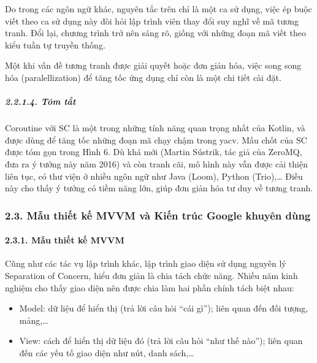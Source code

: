 Do trong các ngôn ngữ khác, nguyên tắc trên chỉ là một ca sử dụng, việc
ép buộc viết theo ca sử dụng này đòi hỏi lập trình viên thay đổi suy
nghĩ về mã tương tranh. Đổi lại, chương trình trở nên sáng rõ, giống với
những đoạn mã viết theo kiểu tuần tự truyền thống.

Một khi vấn đề tương tranh được giải quyết hoặc đơn giản hóa, việc song
song hóa (paralellization) để tăng tốc ứng dụng chỉ còn là một chi tiết
cài đặt.

\hypertarget{tuxf3m-tux1eaft}{%
  \subparagraph{2.2.1.4. Tóm tắt}\label{tuxf3m-tux1eaft}}

Coroutine với SC là một trong những tính năng quan trọng nhất của
Kotlin, và được dùng để tăng tốc những đoạn mã chạy chậm trong yacv. Mấu
chốt của SC được tóm gọn trong Hình 6. Dù khá mới (Martin Sústrik, tác
giả của ZeroMQ, đưa ra ý tưởng này năm 2016) và còn tranh cãi, mô hình
này vẫn được cải thiện liên tục, có thư viện ở nhiều ngôn ngữ như Java
(Loom), Python (Trio),\ldots{} Điều này cho thấy ý tưởng có tiềm năng
lớn, giúp đơn giản hóa tư duy về tương tranh.

\hypertarget{mux1eabu-thiux1ebft-kux1ebf-mvvm-vuxe0-kiux1ebfn-truxfac-google-khuyuxean-duxf9ng}{%
  \subsubsection{\texorpdfstring{2.3. Mẫu thiết kế MVVM và Kiến trúc
      Google khuyên dùng
    }{2.3. Mẫu thiết kế MVVM và Kiến trúc Google khuyên dùng }}\label{mux1eabu-thiux1ebft-kux1ebf-mvvm-vuxe0-kiux1ebfn-truxfac-google-khuyuxean-duxf9ng}}

\hypertarget{mux1eabu-thiux1ebft-kux1ebf-mvvm}{%
  \paragraph{\texorpdfstring{2.3.1. Mẫu thiết kế MVVM
    }{2.3.1. Mẫu thiết kế MVVM }}\label{mux1eabu-thiux1ebft-kux1ebf-mvvm}}

Cũng như các tác vụ lập trình khác, lập trình giao diện sử dụng nguyên
lý Separation of Concern, hiểu đơn giản là chia tách chức năng. Nhiều
năm kinh nghiệm cho thấy giao diện nên được chia làm hai phần chính tách
biệt nhau:

\begin{itemize}
  
  \item
        Model: dữ liệu để hiển thị (trả lời câu hỏi ``cái gì''); liên quan đến
        đối tượng, mảng,\ldots{}
  \item
        View: cách để hiển thị dữ liệu đó (trả lời câu hỏi ``như thế nào'');
        liên quan đến các yếu tố giao diện như nút, danh sách,\ldots{}
\end{itemize}

